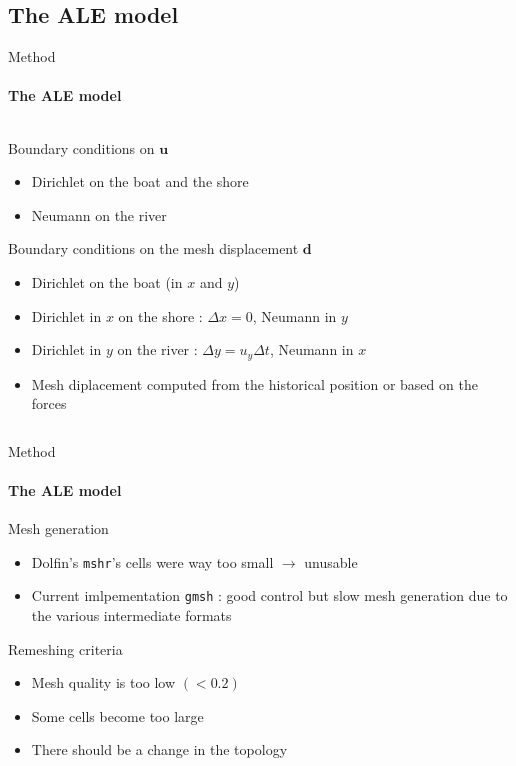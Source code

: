 \documentclass[aspectratio=169]{beamer}
\begin{document}
\subsection{The ALE model}
\begin{frame}{Method}
    \framesubtitle{The ALE model}

    \begin{columns}
    \begin{column}{.79\textwidth}
        Boundary conditions on $\bm{u}$
        \begin{itemize}
            \item Dirichlet on the boat and the shore
            \item Neumann on the river
        \end{itemize}
            
        \vspace{0.5cm}
        Boundary conditions on the mesh displacement $\bm{d}$
        \begin{itemize}
            \item Dirichlet on the boat (in $x$ and $y$)
            \item Dirichlet in $x$ on the shore : $\Delta x = 0$, Neumann in $y$
            \item Dirichlet in $y$ on the river : $\Delta y = u_y \Delta t$, Neumann in $x$
            \item Mesh diplacement computed from the historical position or based on the forces
        \end{itemize}


    \end{column}
    
    \begin{column}{.19\textwidth}
    \begin{center}
        
    \end{center}
    \end{column}
    \end{columns}
\end{frame}


\begin{frame}{Method}
    \framesubtitle{The ALE model}
    Mesh generation
    \begin{itemize}
        \item Dolfin's \texttt{mshr}'s cells were way too small $\longrightarrow$ unusable
        \item Current imlpementation \texttt{gmsh} : good control but slow mesh generation due to the various intermediate formats
    \end{itemize}

    \vfill
    Remeshing criteria
    \begin{itemize}
        \item Mesh quality is too low $(<0.2)$
        \item Some cells become too large
        \item There should be a change in the topology
    \end{itemize}
\end{frame}
\end{document}
